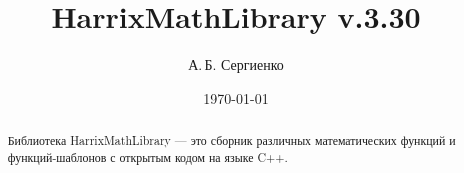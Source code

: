 \documentclass[a4paper,12pt]{article}
\title{HarrixMathLibrary v.3.30}
\author{А.\,Б. Сергиенко}
\date{\today}
\begin{document}


\maketitle

\begin{abstract}
Библиотека HarrixMathLibrary --- это сборник различных математических функций и функций-шаблонов с открытым кодом на языке C++.
\end{abstract}

\tableofcontents
\end{document}
